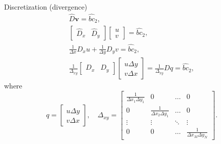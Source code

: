 \documentclass{beamer}
\begin{document}
	
	\begin{frame}{Discretization (divergence)}
	\begin{equation*}
	\begin{gathered}
	\hat{D}\boldsymbol{v}=\hat{bc}_2,\\
	\left[ 
	\begin{array}{ll}
	\hat{D}_x & \hat{D}_y 	
	\end{array}
	\right]\left[\begin{array}{l}
	u\\
	v
	\end{array}
	\right]=\hat{bc}_2
	, \\
	\frac{1}{\Delta x} D_x u+\frac{1}{\Delta y} D_y v=\hat{bc}_2, \\
	\frac{1}{\Delta _{xy}}\left[\begin{array}{ll}
	D_x & D_y
	\end{array}\right]\left[\begin{array}{l}
	u \Delta y \\
	v \Delta x
	\end{array}\right]=\frac{1}{\Delta _{xy}} D q=\hat{bc}_2,
	\end{gathered}
	\end{equation*}	
	where 
	\begin{equation}\label{eqn:delta-xy}
		q=\left[\begin{array}{l}
	u \Delta y \\
	v \Delta x
	\end{array}\right], \quad \Delta _{xy}=
		\begin{bmatrix}{}
			\frac{1}{\Delta x_1\Delta y_1}		&0	&\dots	&0\\
			0		&\frac{1}{\Delta x_2\Delta y_1}	&\dots	&0\\
			\vdots		&\vdots	&\ddots	&\vdots\\
			0		&0	&\dots	&\frac{1}{\Delta x_M\Delta y_N}
		\end{bmatrix}.
	\end{equation}
	\end{frame}
	
\end{document}
